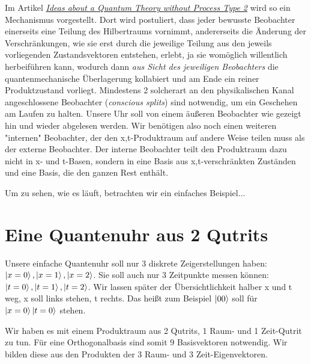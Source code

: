 \documentclass[12pt]{article}
\begin{document}
Im Artikel \emph{\href{https://docs.google.com/document/d/1OrmVETmnBSe5c0CpTbKH8Vq5pWFuB8QUez-KqHTaarQ/edit?usp=sharing}{Ideas about a Quantum Theory without Process Type 2}} wird so ein Mechanismus vorgestellt. Dort wird postuliert, dass jeder bewusste Beobachter einerseits eine Teilung des Hilbertraums vornimmt, andererseits die Änderung der Verschränkungen, wie sie erst durch die jeweilige Teilung aus den jeweils vorliegenden Zustandsvektoren entstehen, erlebt, ja sie womöglich willentlich herbeiführen kann, wodurch dann \emph{aus Sicht des jeweiligen Beobachters} die quantenmechanische Überlagerung kollabiert und am Ende ein reiner Produktzustand vorliegt. Mindestens 2 solcherart an den physikalischen Kanal angeschlossene Beobachter (\emph{conscious splits}) sind notwendig, um ein Geschehen am Laufen zu halten. Unsere Uhr soll von einem äußeren Beobachter wie gezeigt hin und wieder abgelesen werden. Wir benötigen also noch einen weiteren "internen" Beobachter, der den x,t-Produktraum auf andere Weise teilen muss als der externe Beobachter. Der interne Beobachter teilt den Produktraum dazu nicht in x- und t-Basen, sondern in eine Basis aus x,t-verschränkten Zuständen und eine Basis, die den ganzen Rest enthält.

Um zu sehen, wie es läuft, betrachten wir ein einfaches Beispiel...

\section{Eine Quantenuhr aus 2 Qutrits}

Unsere einfache Quantenuhr soll nur 3 diskrete Zeigerstellungen haben: $\ket{x=0}, \ket{x=1}, \ket{x=2}$. Sie soll auch nur 3 Zeitpunkte messen können: $\ket{t=0}, \ket{t=1}, \ket{t=2}$. Wir lassen später der Übersichtlichkeit halber x und t weg, x soll links stehen, t rechts. Das heißt zum Beispiel $\ket{00}$ soll für $\ket{x=0}\ket{t=0}$ stehen. 

Wir haben es mit einem Produktraum aus 2 Qutrits, 1 Raum- und 1 Zeit-Qutrit zu tun. Für eine Orthogonalbasis sind somit 9 Basisvektoren notwendig. Wir bilden diese aus den Produkten der 3 Raum- und 3 Zeit-Eigenvektoren.
\end{document}

